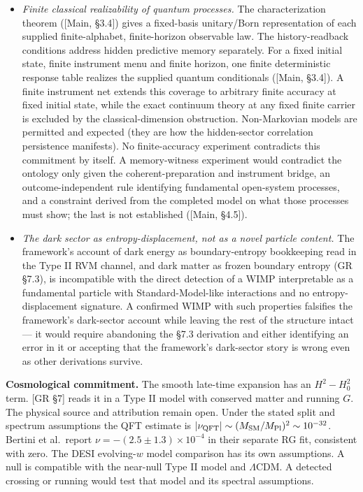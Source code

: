 \documentclass[
]{article}
\providecommand{\tightlist}{%
  \setlength{\itemsep}{0pt}\setlength{\parskip}{0pt}}
\begin{document}
\begin{itemize}
\tightlist
\item
  \emph{Finite classical realizability of quantum processes.} The
  characterization theorem ({[}Main, §3.4{]}) gives a fixed-basis
  unitary/Born representation of each supplied finite-alphabet,
  finite-horizon observable law. The history-readback conditions address
  hidden predictive memory separately. For a fixed initial state, finite
  instrument menu and finite horizon, one finite deterministic response
  table realizes the supplied quantum conditionals ({[}Main, §3.4{]}). A
  finite instrument net extends this coverage to arbitrary finite
  accuracy at fixed initial state, while the exact continuum theory at
  any fixed finite carrier is excluded by the classical-dimension
  obstruction. Non-Markovian models are permitted and expected (they are
  how the hidden-sector correlation persistence manifests). No
  finite-accuracy experiment contradicts this commitment by itself. A
  memory-witness experiment would contradict the ontology only given the
  coherent-preparation and instrument bridge, an outcome-independent
  rule identifying fundamental open-system processes, and a constraint
  derived from the completed model on what those processes must show;
  the last is not established ({[}Main, §4.5{]}).
\item
  \emph{The dark sector as entropy-displacement, not as a novel particle
  content.} The framework's account of dark energy as boundary-entropy
  bookkeeping read in the Type II RVM channel, and dark matter as frozen
  boundary entropy (GR §7.3), is incompatible with the direct detection
  of a WIMP interpretable as a fundamental particle with
  Standard-Model-like interactions and no entropy-displacement
  signature. A confirmed WIMP with such properties falsifies the
  framework's dark-sector account while leaving the rest of the
  structure intact --- it would require abandoning the §7.3 derivation
  and either identifying an error in it or accepting that the
  framework's dark-sector story is wrong even as other derivations
  survive.
\end{itemize}

\textbf{Cosmological commitment.} The smooth late-time expansion has an
\(H^2-H_0^2\) term. {[}GR §7{]} reads it in a Type II model with
conserved matter and running \(G\). The physical source and attribution
remain open. Under the stated split and spectrum assumptions the QFT
estimate is
\(\lvert\nu_{\rm QFT}\rvert\sim(M_{\rm SM}/M_{\rm Pl})^2\sim10^{-32}\).
Bertini et al.~report \(\nu=-(2.5\pm1.3)\times10^{-4}\) in their
separate RG fit, consistent with zero. The DESI evolving-\(w\) model
comparison has its own assumptions. A null is compatible with the
near-null Type II model and \(\Lambda\)CDM. A detected crossing or
running would test that model and its spectral assumptions.
\end{document}
